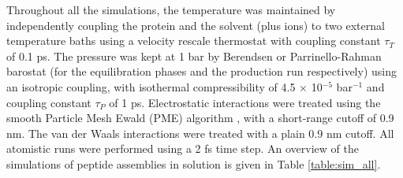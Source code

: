 Throughout all the simulations, the temperature was maintained by independently coupling the protein and the solvent (plus ions) to two external temperature baths using a velocity rescale thermostat \citep{Bussi2007} with coupling constant $\tau _T$ of 0.1 ps. The pressure was kept at 1 bar by Berendsen \citep{Berendsen1984} or Parrinello-Rahman barostat \citep{Parrinello1981} (for the equilibration phases and the production run respectively) using an isotropic coupling, with isothermal compressibility of 4.5 $\times$ 10$^{-5}$ bar$^{-1}$ and coupling constant $\tau_P$ of 1 ps. Electrostatic interactions were treated using the smooth Particle Mesh Ewald (PME) algorithm \citep{Essmann1995}, with a short-range cutoff of 0.9 nm. The van der Waals interactions were treated with a plain 0.9 nm cutoff. All atomistic runs were performed using a 2 fs time step. An overview of the simulations of peptide assemblies in solution is given in Table \ref{table:sim_all}.

